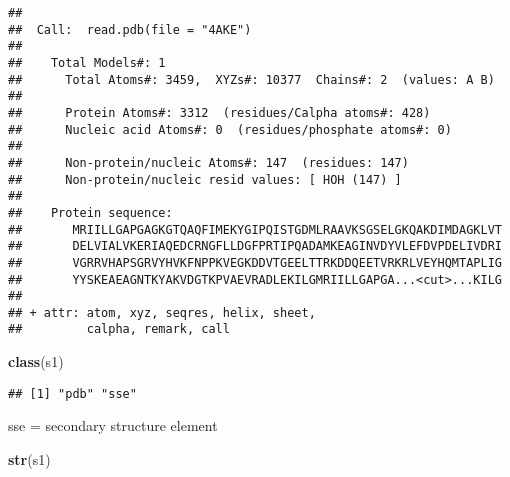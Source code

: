 \documentclass[]{article}
\newenvironment{Shaded}{\begin{snugshade}}{\end{snugshade}}
\newcommand{\KeywordTok}[1]{\textcolor[rgb]{0.13,0.29,0.53}{\textbf{#1}}}
\newcommand{\NormalTok}[1]{#1}
\begin{document}
\begin{verbatim}
## 
##  Call:  read.pdb(file = "4AKE")
## 
##    Total Models#: 1
##      Total Atoms#: 3459,  XYZs#: 10377  Chains#: 2  (values: A B)
## 
##      Protein Atoms#: 3312  (residues/Calpha atoms#: 428)
##      Nucleic acid Atoms#: 0  (residues/phosphate atoms#: 0)
## 
##      Non-protein/nucleic Atoms#: 147  (residues: 147)
##      Non-protein/nucleic resid values: [ HOH (147) ]
## 
##    Protein sequence:
##       MRIILLGAPGAGKGTQAQFIMEKYGIPQISTGDMLRAAVKSGSELGKQAKDIMDAGKLVT
##       DELVIALVKERIAQEDCRNGFLLDGFPRTIPQADAMKEAGINVDYVLEFDVPDELIVDRI
##       VGRRVHAPSGRVYHVKFNPPKVEGKDDVTGEELTTRKDDQEETVRKRLVEYHQMTAPLIG
##       YYSKEAEAGNTKYAKVDGTKPVAEVRADLEKILGMRIILLGAPGA...<cut>...KILG
## 
## + attr: atom, xyz, seqres, helix, sheet,
##         calpha, remark, call
\end{verbatim}

\begin{Shaded}
\begin{Highlighting}[]
\KeywordTok{class}\NormalTok{(s1)}
\end{Highlighting}
\end{Shaded}

\begin{verbatim}
## [1] "pdb" "sse"
\end{verbatim}

sse = secondary structure element

\begin{Shaded}
\begin{Highlighting}[]
\KeywordTok{str}\NormalTok{(s1)}
\end{Highlighting}
\end{Shaded}
\end{document}
